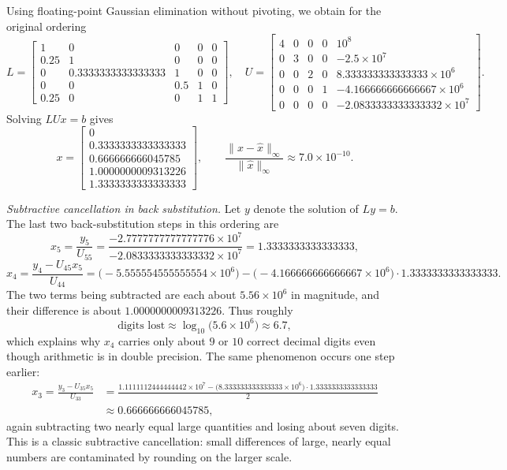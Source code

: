 \documentclass[11pt]{article}
\begin{document}
Using floating-point Gaussian elimination without pivoting, we obtain for the original ordering
\[
L=
\begin{bmatrix}
1&0&0&0&0\\
0.25&1&0&0&0\\
0&0.3333333333333333&1&0&0\\
0&0&0.5&1&0\\
0.25&0&0&1&1
\end{bmatrix},\quad
U=
\begin{bmatrix}
4&0&0&0&10^{8}\\
0&3&0&0&-2.5\times 10^{7}\\
0&0&2&0&8.333333333333333\times 10^{6}\\
0&0&0&1&-4.166666666666667\times 10^{6}\\
0&0&0&0&-2.0833333333333332\times 10^{7}
\end{bmatrix}.
\]
Solving \(LUx=b\) gives
\[
x=
\begin{bmatrix}
0\\
0.3333333333333333\\
0.666666666045785\\
1.0000000009313226\\
1.3333333333333333
\end{bmatrix},
\qquad
\frac{\lVert x-\hat x\rVert_{\infty}}{\lVert \hat x\rVert_{\infty}}\approx 7.0\times 10^{-10}.
\]

\emph{Subtractive cancellation in back substitution.}
Let \(y\) denote the solution of \(Ly=b\). The last two back-substitution steps in this ordering are
\[
x_{5}=\frac{y_{5}}{U_{55}}=\frac{-2.7777777777777776\times 10^{7}}{-2.0833333333333332\times 10^{7}}=1.3333333333333333,
\]
\[
x_{4}=\frac{y_{4}-U_{45}x_{5}}{U_{44}}=\bigl(-5.555554555555554\times 10^{6}\bigr)-\bigl(-4.166666666666667\times 10^{6}\bigr)\cdot 1.3333333333333333.
\]
The two terms being subtracted are each about \(5.56\times 10^{6}\) in magnitude, and their difference is about \(1.0000000009313226\). Thus roughly
\[
\text{digits lost}\approx \log_{10}\!\bigl(5.6\times 10^{6}\bigr)\approx 6.7,
\]
which explains why \(x_{4}\) carries only about \(9\) or \(10\) correct decimal digits even though arithmetic is in double precision. The same phenomenon occurs one step earlier:
\begin{align*}
x_{3}=\frac{y_{3}-U_{35}x_{5}}{U_{33}}&=\frac{1.1111112444444442\times 10^{7}-\bigl(8.333333333333333\times 10^{6}\bigr)\cdot 1.3333333333333333}{2}\\
&\approx 0.666666666045785,
\end{align*}
again subtracting two nearly equal large quantities and losing about seven digits. This is a classic subtractive cancellation: small differences of large, nearly equal numbers are contaminated by rounding on the larger scale.
\end{document}
